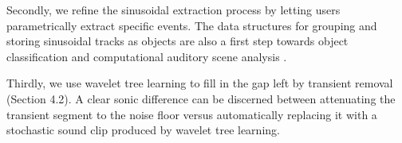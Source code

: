 \documentclass[a4paper]{article}
\begin{document}

Secondly, we refine the sinusoidal extraction process by letting users 
parametrically extract specific events. 
The data structures for grouping and storing sinusoidal tracks as 
objects are also a first step towards object classification and 
computational auditory scene analysis \cite{Bregman90}. 

Thirdly, we use wavelet tree learning to fill in the gap left by 
transient removal (Section 4.2). A clear sonic difference
can be discerned between attenuating the transient segment to the noise floor versus 
automatically replacing it with a stochastic sound clip 
produced by wavelet tree learning. 

\end{document}
